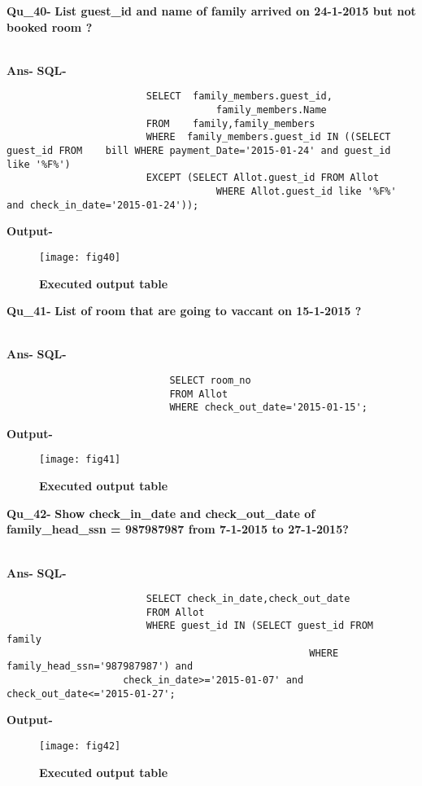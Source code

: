 \documentclass[a4,12pt]{report}
\begin{document}
\newpage
\textbf{Qu\_40-}  \textbf{List guest\_id and name of family arrived on 24-1-2015 but not booked room  ?} \\\

\textbf{Ans-}		\textbf{SQL-}
\begin{lstlisting}
						SELECT  family_members.guest_id,
									family_members.Name  
						FROM 	family,family_members  
						WHERE  family_members.guest_id IN ((SELECT guest_id FROM 	bill WHERE payment_Date='2015-01-24' and guest_id like '%F%') 
						EXCEPT (SELECT Allot.guest_id FROM Allot
									WHERE Allot.guest_id like '%F%' and check_in_date='2015-01-24'));
\end{lstlisting}
\textbf{Output-} \\			   
\begin{figure}[hbtp]
\centering
\texttt{[image: fig40]}
\caption{\textbf{{\color{red}Executed output table}}}
\end{figure}

\textbf{Qu\_41-}  \textbf{List of room that are going to vaccant on 15-1-2015 ?} \\\

\textbf{Ans-}		\textbf{SQL-}
\begin{lstlisting}
							SELECT room_no 
							FROM Allot 
							WHERE check_out_date='2015-01-15';
\end{lstlisting}
\textbf{Output-} \\			   
\begin{figure}[hbtp]
\centering
\texttt{[image: fig41]}
\caption{\textbf{{\color{red}Executed output table}}}
\end{figure}

\newpage
\textbf{Qu\_42-}  \textbf{Show check\_in\_date and check\_out\_date of family\_head\_ssn = 987987987 from 7-1-2015 to 27-1-2015?} \\\

\textbf{Ans-}		\textbf{SQL-}
\begin{lstlisting}
						SELECT check_in_date,check_out_date 
						FROM Allot 
						WHERE guest_id IN (SELECT guest_id FROM 	family 
													WHERE family_head_ssn='987987987') and 
					check_in_date>='2015-01-07' and check_out_date<='2015-01-27'; 

\end{lstlisting}
\textbf{Output-} \\			   
\begin{figure}[hbtp]
\centering
\texttt{[image: fig42]}
\caption{\textbf{{\color{red}Executed output table}}}
\end{figure}
\end{document}
